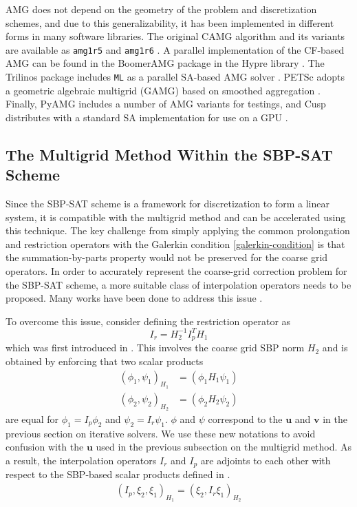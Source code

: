 AMG does not depend on the geometry of the problem and discretization schemes, and due to this generalizability, it has been implemented in different forms in many software libraries. The original CAMG algorithm and its variants are available as \texttt{amg1r5} and \texttt{amg1r6} \citep{ruge1987algebraic}. A parallel implementation of the CF-based AMG can be found in the BoomerAMG package in the Hypre library \citep{yang2002boomeramg}. The Trilinos package includes \texttt{ML} as a parallel SA-based AMG solver \citep{gee2006ml}.
PETSc adopts a geometric algebraic multigrid (GAMG) based on smoothed aggregation \citep{petsc-web-page}.
Finally, PyAMG includes a number of AMG variants for testings, and Cusp distributes with a standard SA implementation for use on a GPU \citep{dalton2014cusp,bell2022pyamg}. 

\subsection{The Multigrid Method Within the SBP-SAT Scheme}
Since the SBP-SAT scheme is a framework for discretization to form a linear system, it is compatible with the multigrid method and can be accelerated using this technique. The key challenge from simply applying the common prolongation and restriction operators with the Galerkin condition \autoref{galerkin-condition} is that the summation-by-parts property would not be preserved for the coarse grid operators. In order to accurately represent the coarse-grid correction problem for the SBP-SAT scheme, a more suitable class of interpolation operators needs to be proposed. Many works have been done to address this issue \citep{RUGGIU2018216}.

To overcome this issue, consider defining the restriction operator as 
\begin{equation}
    I_r = H_2^{-1}I_p^TH_1
    \label{eqn:interpolation_sbp}
\end{equation}
which was first introduced in \citep{RUGGIU2018216}. This involves the coarse grid SBP norm $H_2$ and is obtained by enforcing that two scalar products
\begin{align}
    (\phi_1,\psi_1)_{H_1} &= (\phi_1H_1\psi_1) \\
     (\phi_2,\psi_2)_{H_2} &= (\phi_2H_2\psi_2)
\end{align}
are equal for $\phi_1 = I_p\phi_2$ and $\psi_2 = I_r \psi_1$. $\phi$ and $\psi$ correspond to the $\boldsymbol{u}$ and $\boldsymbol{v}$ in the previous section on iterative solvers. We use these new notations to avoid confusion with the $\mathbf{u}$ used in the previous subsection on the multigrid method. As a result, the interpolation operators $I_r$ and $I_p$ are adjoints to each other with respect to the SBP-based scalar products defined in \citep{hackbusch2013multi}.
\begin{align}
    (I_p,\xi_2,\xi_1)_{H_1} = (\xi_2,I_r\xi_1)_{H_2}
    \label{eqn:adjoint}
\end{align}

